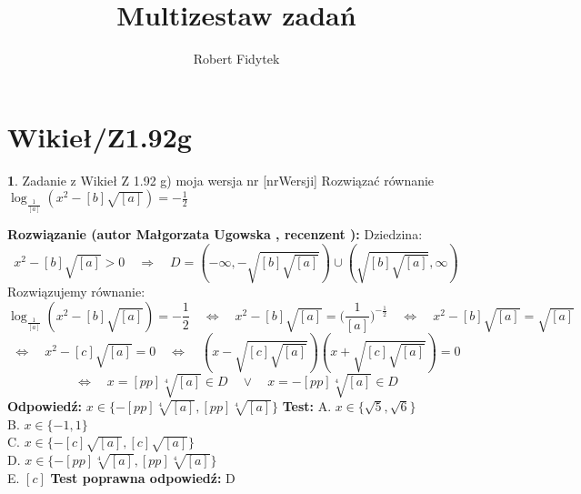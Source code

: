 \documentclass[12pt, a4paper]{article}
\title{Multizestaw zadań}
\author{Robert Fidytek}
\date{}
\theoremstyle{definition} %
\newtheorem{zad}{}
\newcommand{\kategoria}[1]{\section{#1}} %
\newcommand{\zadStart}[1]{\begin{zad}#1\newline} %
\newcommand{\zadStop}{\end{zad}}   %
\newcommand{\rozwStart}[2]{\noindent \textbf{Rozwiązanie (autor #1 , recenzent #2): }\newline} %
\newcommand{\rozwStop}{\newline}                                            %
\newcommand{\odpStart}{\noindent \textbf{Odpowiedź:}\newline}    %
\newcommand{\odpStop}{\newline}                                             %
\newcommand{\testStart}{\noindent \textbf{Test:}\newline} %
\newcommand{\testStop}{\newline} %
\newcommand{\kluczStart}{\noindent \textbf{Test poprawna odpowiedź:}\newline} %
\newcommand{\kluczStop}{\newline} %
\begin{document}
\maketitle


\kategoria{Wikieł/Z1.92g}
\zadStart{Zadanie z Wikieł Z 1.92 g) moja wersja nr [nrWersji]}
Rozwiązać równanie $\log_{\frac{1}{[a]}}{(x^2-[b] \sqrt{[a]})}=-\frac{1}{2}$
\zadStop
\rozwStart{Małgorzata Ugowska}{}
Dziedzina:
$$x^2-[b] \sqrt{[a]} >0  \quad \Longrightarrow \quad D =  (-\infty, - \sqrt{[b] \sqrt{[a]}}) \cup (\sqrt{[b] \sqrt{[a]}}, \infty)$$
Rozwiązujemy równanie:
$$\log_{\frac{1}{[a]}}{(x^2-[b] \sqrt{[a]})}=-\frac{1}{2} \quad \Longleftrightarrow \quad x^2-[b] \sqrt{[a]}=\Big(\frac{1}{[a]}\Big)^{-\frac{1}{2}} \quad  \Longleftrightarrow \quad x^2-[b] \sqrt{[a]}= \sqrt{[a]}$$
$$\Longleftrightarrow \quad x^2-[c] \sqrt{[a]}= 0 \quad \Longleftrightarrow \quad (x- \sqrt{[c] \sqrt{[a]}})(x+ \sqrt{[c] \sqrt{[a]}}) =0 $$
$$ \Longleftrightarrow \quad x = [pp] \sqrt[4]{[a]} \in D \quad \vee \quad x = - [pp] \sqrt[4]{[a]} \in D$$
\rozwStop
\odpStart
$x \in \{- [pp] \sqrt[4]{[a]}, [pp] \sqrt[4]{[a]}\}$
\odpStop
\testStart
A. $x \in \{\sqrt{5}, \sqrt{6}\}$\\
B. $x \in \{- 1, 1\}$\\
C. $x \in \{- [c] \sqrt{[a]}, [c] \sqrt{[a]}\}$\\
D. $x \in \{- [pp] \sqrt[4]{[a]}, [pp] \sqrt[4]{[a]}\}$\\
E. $[c]$
\testStop
\kluczStart
D
\kluczStop
\end{document}
